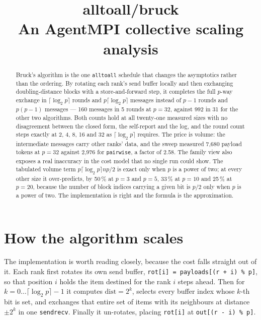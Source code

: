\documentclass[11pt]{article}
\title{\textbf{alltoall/bruck}\\[2pt]\large An AgentMPI collective scaling analysis}
\author{}
\date{}
\begin{document}
\maketitle

\begin{abstract}
Bruck's algorithm is the one \texttt{alltoall} schedule that changes the asymptotics rather
than the ordering. By rotating each rank's send buffer locally and then exchanging
doubling-distance blocks with a store-and-forward step, it completes the full $p$-way exchange
in $\lceil\log_2 p\rceil$ rounds and $p\lceil\log_2 p\rceil$ messages instead of $p-1$ rounds
and $p(p-1)$ messages --- 160 messages in 5 rounds at $p=32$, against 992 in 31 for the other
two algorithms. Both counts hold at all twenty-one measured sizes with no disagreement between
the closed form, the self-report and the log, and the round count steps exactly at 2, 4, 8, 16
and 32 as $\lceil\log_2 p\rceil$ requires. The price is volume: the intermediate messages carry
other ranks' data, and the sweep measured 7,680 payload tokens at $p=32$ against 2,976 for
\texttt{pairwise}, a factor of 2.58. The family view also exposes a real inaccuracy in the cost
model that no single run could show. The tabulated volume term $p\lceil\log_2 p\rceil np/2$ is
exact only when $p$ is a power of two; at every other size it over-predicts, by 50\,\% at
$p=3$ and $p=5$, 33\,\% at $p=10$ and 25\,\% at $p=20$, because the number of block indices
carrying a given bit is $p/2$ only when $p$ is a power of two. The implementation is right and
the formula is the approximation.
\end{abstract}



\section{How the algorithm scales}

The implementation is worth reading closely, because the cost falls straight out of it. Each
rank first rotates its own send buffer, \texttt{rot[i] = payloads[(r + i) \% p]}, so that
position $i$ holds the item destined for the rank $i$ steps ahead. Then for
$k = 0 \ldots \lceil\log_2 p\rceil - 1$ it computes $\text{dist} = 2^k$, selects every buffer
index whose $k$-th bit is set, and exchanges that entire set of items with its neighbours at
distance $\pm 2^k$ in one \texttt{sendrecv}. Finally it un-rotates, placing \texttt{rot[i]} at
\texttt{out[(r - i) \% p]}.
\end{document}
